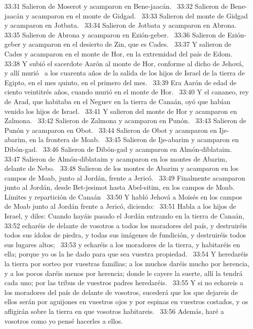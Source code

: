 33:31 Salieron de Moserot y acamparon en Bene-jaacán.  
33:32 Salieron de Bene-jaacán y acamparon en el monte de Gidgad.  
33:33 Salieron del monte de Gidgad y acamparon en Jotbata.  
33:34 Salieron de Jotbata y acamparon en Abrona.  
33:35 Salieron de Abrona y acamparon en Ezión-geber.  
33:36 Salieron de Ezión-geber y acamparon en el desierto de Zin, que es Cades.  
33:37 Y salieron de Cades y acamparon en el monte de Hor, en la extremidad del país de Edom.  
33:38 Y subió el sacerdote Aarón al monte de Hor, conforme al dicho de Jehová, y allí murió  a los cuarenta años de la salida de los hijos de Israel de la tierra de Egipto, en el mes quinto, en el primero del mes.  
33:39 Era Aarón de edad de ciento veintitrés años, cuando murió en el monte de Hor.  
33:40 Y el cananeo, rey de Arad, que habitaba en el Neguev en la tierra de Canaán, oyó que habían venido los hijos de Israel.  
33:41 Y salieron del monte de Hor y acamparon en Zalmona.  
33:42 Salieron de Zalmona y acamparon en Punón.  
33:43 Salieron de Punón y acamparon en Obot.  
33:44 Salieron de Obot y acamparon en Ije-abarim, en la frontera de Moab.  
33:45 Salieron de Ije-abarim y acamparon en Dibón-gad.  
33:46 Salieron de Dibón-gad y acamparon en Almón-diblataim.  
33:47 Salieron de Almón-diblataim y acamparon en los montes de Abarim, delante de Nebo.  
33:48 Salieron de los montes de Abarim y acamparon en los campos de Moab, junto al Jordán, frente a Jericó.  
33:49 Finalmente acamparon junto al Jordán, desde Bet-jesimot hasta Abel-sitim, en los campos de Moab.  
Límites y repartición de Canaán  
33:50 Y habló Jehová a Moisés en los campos de Moab junto al Jordán frente a Jericó, diciendo:  
33:51 Habla a los hijos de Israel, y diles: Cuando hayáis pasado el Jordán entrando en la tierra de Canaán,  
33:52 echaréis de delante de vosotros a todos los moradores del país, y destruiréis todos sus ídolos de piedra, y todas sus imágenes de fundición, y destruiréis todos sus lugares altos;  
33:53 y echaréis a los moradores de la tierra, y habitaréis en ella; porque yo os la he dado para que sea vuestra propiedad.  
33:54 Y heredaréis la tierra por sorteo por vuestras familias; a los muchos daréis mucho por herencia, y a los pocos daréis menos por herencia; donde le cayere la suerte, allí la tendrá cada uno; por las tribus de vuestros padres heredaréis.  
33:55 Y si no echareis a los moradores del país de delante de vosotros, sucederá que los que dejareis de ellos serán por aguijones en vuestros ojos y por espinas en vuestros costados, y os afligirán sobre la tierra en que vosotros habitareis.  
33:56 Además, haré a vosotros como yo pensé hacerles a ellos.  
